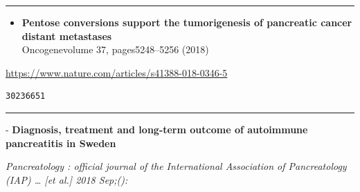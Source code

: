 \documentclass[]{article}
\providecommand{\tightlist}{%
  \setlength{\itemsep}{0pt}\setlength{\parskip}{0pt}}
\begin{document}
\begin{center}\rule{0.5\linewidth}{\linethickness}\end{center}

\begin{itemize}
\tightlist
\item
  \textbf{Pentose conversions support the tumorigenesis of pancreatic
  cancer distant metastases}\\
  Oncogenevolume 37, pages5248--5256 (2018)
\end{itemize}

\url{https://www.nature.com/articles/s41388-018-0346-5}

\begin{verbatim}
30236651
\end{verbatim}

\begin{center}\rule{0.5\linewidth}{\linethickness}\end{center}

 - \textbf{Diagnosis, treatment and long-term outcome of autoimmune
pancreatitis in Sweden}

\emph{Pancreatology : official journal of the International Association
of Pancreatology (IAP) \ldots{} {[}et al.{]} 2018 Sep;():}
\end{document}
